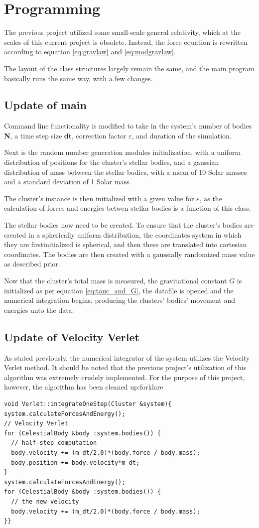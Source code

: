 \documentclass[11pt,a4paper,notitlepage,twocolumn]{article}
\begin{document}
\section{Programming}
The previous project utilized some small-scale general relativity, which at the scales of this current project is obsolete. Instead, the force equation is rewritten according to equation \ref{eq:gravlaw} and \ref{eq:modgravlaw}.

The layout of the class structures largely remain the same, and the main program basically runs the same way, with a few changes.

\subsection{Update of main}
Command line functionality is modified to take in the system's number of bodies \textbf{N}, a time step size \textbf{dt}, correction factor $\varepsilon$, and duration of the simulation.

Next is the random number generation modules initialization, with a uniform distribution of positions for the cluster's stellar bodies, and a gaussian distribution of mass between the stellar bodies, with a mean of 10 Solar masses and a standard deviation of 1 Solar mass.

The cluster's instance is then initialized with a given value for $\varepsilon$, as the calculation of forces and energies betwen stellar bodies is a function of this class.

The stellar bodies now need to be created. To ensure that the cluster's bodies are created in a spherically uniform distribution, the coordinates system in which they are firstinitialized is spherical, and then these are translated into cartesian coordinates. The bodies are then created with a gaussially randomized mass value as described prior.

Now that the cluster's total mass is measured, the gravitational constant $G$ is initialized as per equation \ref{eq:tauc_and_G}, the datafile is opened and the numerical integration begins, producing the clusters' bodies' movement and energies unto the data.

\subsection{Update of Velocity Verlet}
As stated previously, the numerical integrator of the system utilizes the Velocity Verlet method. It should be noted that the previous project's utilization of this algorithm was extremely crudely implemented. For the purpose of this project, however, the algorithm has been cleaned up:forklare
\lstset{style=c++style}
\begin{lstlisting}
void Verlet::integrateOneStep(Cluster &system){
system.calculateForcesAndEnergy();
// Velocity Verlet
for (CelestialBody &body :system.bodies()) {
  // half-step computation
  body.velocity += (m_dt/2.0)*(body.force / body.mass);
  body.position += body.velocity*m_dt;
}
system.calculateForcesAndEnergy();
for (CelestialBody &body :system.bodies()) {
  // the new velocity
  body.velocity += (m_dt/2.0)*(body.force / body.mass);
}}
\end{lstlisting}
\end{document}
